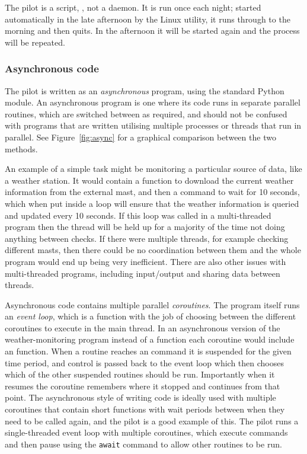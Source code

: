 \begin{colsection}
\begin{colsection}
The pilot is a  script, , not a daemon. It is run once each night; started automatically in the late afternoon by the Linux  utility, it runs through to the morning and then quits. In the afternoon it will be started again and the process will be repeated.

\subsubsection{Asynchronous code}

The pilot is written as an \textit{asynchronous} program, using the standard Python  module. An asynchronous program is one where its code runs in separate parallel routines, which are switched between as required, and should not be confused with programs that are written utilising multiple processes or threads that run in parallel. See Figure~\ref{fig:async} for a graphical comparison between the two methods.

An example of a simple task might be monitoring a particular source of data, like a weather station. It would contain a function to download the current weather information from the external mast, and then a  command to wait for 10 seconds, which when put inside a loop will ensure that the weather information is queried and updated every 10 seconds. If this loop was called in a multi-threaded program then the thread will be held up for a majority of the time not doing anything between checks. If there were multiple threads, for example checking different masts, then there could be no coordination between them and the whole program would end up being very inefficient. There are also other issues with multi-threaded programs, including input/output and sharing data between threads.

Asynchronous code contains multiple parallel \textit{coroutines}. The program itself runs an \textit{event loop}, which is a function with the job of choosing between the different coroutines to execute in the main thread. In an asynchronous version of the weather-monitoring program instead of a  function each coroutine would include an  function. When a routine reaches an  command it is suspended for the given time period, and control is passed back to the event loop which then chooses which of the other suspended routines should be run. Importantly when it resumes the coroutine remembers where it stopped and continues from that point. The asynchronous style of writing code is ideally used with multiple coroutines that contain short functions with wait periods between when they need to be called again, and the pilot is a good example of this. The pilot runs a single-threaded event loop with multiple coroutines, which execute commands and then pause using the \texttt{await} command to allow other routines to be run.


\end{colsection}
\end{colsection}
